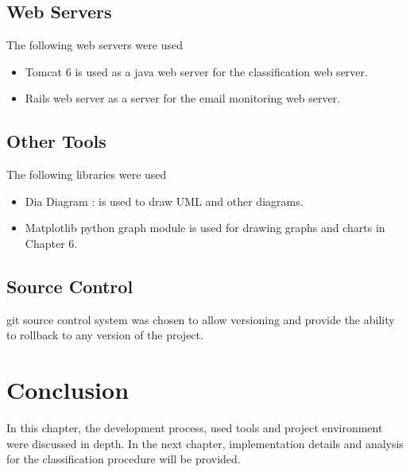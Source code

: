 \subsection{Web Servers}
The following web servers were used
\begin{itemize}
  \item Tomcat 6 is used as a java web server for the classification web server.
  \item Rails web server as a server for the email monitoring web server.
\end{itemize}

\subsection{Other Tools}
The following libraries were used
\begin{itemize}
  \item Dia Diagram : is used to draw UML and other diagrams.
  \item Matplotlib python graph module is used for drawing graphs and charts in Chapter 6.
\end{itemize}

\subsection{Source Control}
git source control system \cite{GIT} was chosen to allow versioning and provide 
the ability to rollback to any version of the project.
\section{Conclusion}
\label{sec:conclusion_5}
In this chapter, the development process, used tools and project environment were 
discussed in depth. In the next chapter, implementation details and analysis for the classification 
procedure will be provided.
